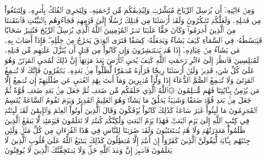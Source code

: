 وَمِنۡ ءَايَٰتِهِۦٓ أَن يُرۡسِلَ ٱلرِّيَاحَ مُبَشِّرَٰتٖ وَلِيُذِيقَكُم مِّن رَّحۡمَتِهِۦ وَلِتَجۡرِيَ ٱلۡفُلۡكُ بِأَمۡرِهِۦ وَلِتَبۡتَغُواْ مِن فَضۡلِهِۦ وَلَعَلَّكُمۡ تَشۡكُرُونَ
وَلَقَدۡ أَرۡسَلۡنَا مِن قَبۡلِكَ رُسُلًا إِلَىٰ قَوۡمِهِمۡ فَجَآءُوهُم بِٱلۡبَيِّنَٰتِ فَٱنتَقَمۡنَا مِنَ ٱلَّذِينَ أَجۡرَمُواْۖ وَكَانَ حَقًّا عَلَيۡنَا نَصۡرُ ٱلۡمُؤۡمِنِينَ
ٱللَّهُ ٱلَّذِي يُرۡسِلُ ٱلرِّيَٰحَ فَتُثِيرُ سَحَابٗا فَيَبۡسُطُهُۥ فِي ٱلسَّمَآءِ كَيۡفَ يَشَآءُ وَيَجۡعَلُهُۥ كِسَفٗا فَتَرَى ٱلۡوَدۡقَ يَخۡرُجُ مِنۡ خِلَٰلِهِۦۖ فَإِذَآ أَصَابَ بِهِۦ مَن يَشَآءُ مِنۡ عِبَادِهِۦٓ إِذَا هُمۡ يَسۡتَبۡشِرُونَ
وَإِن كَانُواْ مِن قَبۡلِ أَن يُنَزَّلَ عَلَيۡهِم مِّن قَبۡلِهِۦ لَمُبۡلِسِينَ
فَٱنظُرۡ إِلَىٰٓ ءَاثَٰرِ رَحۡمَتِ ٱللَّهِ كَيۡفَ يُحۡيِ ٱلۡأَرۡضَ بَعۡدَ مَوۡتِهَآۚ إِنَّ ذَٰلِكَ لَمُحۡيِ ٱلۡمَوۡتَىٰۖ وَهُوَ عَلَىٰ كُلِّ شَيۡءٖ قَدِيرٞ
وَلَئِنۡ أَرۡسَلۡنَا رِيحٗا فَرَأَوۡهُ مُصۡفَرّٗا لَّظَلُّواْ مِنۢ بَعۡدِهِۦ يَكۡفُرُونَ
فَإِنَّكَ لَا تُسۡمِعُ ٱلۡمَوۡتَىٰ وَلَا تُسۡمِعُ ٱلصُّمَّ ٱلدُّعَآءَ إِذَا وَلَّوۡاْ مُدۡبِرِينَ
وَمَآ أَنتَ بِهَٰدِ ٱلۡعُمۡيِ عَن ضَلَٰلَتِهِمۡۖ إِن تُسۡمِعُ إِلَّا مَن يُؤۡمِنُ بِـَٔايَٰتِنَا فَهُم مُّسۡلِمُونَ
۞ٱللَّهُ ٱلَّذِي خَلَقَكُم مِّن ضَعۡفٖ ثُمَّ جَعَلَ مِنۢ بَعۡدِ ضَعۡفٖ قُوَّةٗ ثُمَّ جَعَلَ مِنۢ بَعۡدِ قُوَّةٖ ضَعۡفٗا وَشَيۡبَةٗۚ يَخۡلُقُ مَا يَشَآءُۚ وَهُوَ ٱلۡعَلِيمُ ٱلۡقَدِيرُ
وَيَوۡمَ تَقُومُ ٱلسَّاعَةُ يُقۡسِمُ ٱلۡمُجۡرِمُونَ مَا لَبِثُواْ غَيۡرَ سَاعَةٖۚ كَذَٰلِكَ كَانُواْ يُؤۡفَكُونَ
وَقَالَ ٱلَّذِينَ أُوتُواْ ٱلۡعِلۡمَ وَٱلۡإِيمَٰنَ لَقَدۡ لَبِثۡتُمۡ فِي كِتَٰبِ ٱللَّهِ إِلَىٰ يَوۡمِ ٱلۡبَعۡثِۖ فَهَٰذَا يَوۡمُ ٱلۡبَعۡثِ وَلَٰكِنَّكُمۡ كُنتُمۡ لَا تَعۡلَمُونَ
فَيَوۡمَئِذٖ لَّا يَنفَعُ ٱلَّذِينَ ظَلَمُواْ مَعۡذِرَتُهُمۡ وَلَا هُمۡ يُسۡتَعۡتَبُونَ
وَلَقَدۡ ضَرَبۡنَا لِلنَّاسِ فِي هَٰذَا ٱلۡقُرۡءَانِ مِن كُلِّ مَثَلٖۚ وَلَئِن جِئۡتَهُم بِـَٔايَةٖ لَّيَقُولَنَّ ٱلَّذِينَ كَفَرُوٓاْ إِنۡ أَنتُمۡ إِلَّا مُبۡطِلُونَ
كَذَٰلِكَ يَطۡبَعُ ٱللَّهُ عَلَىٰ قُلُوبِ ٱلَّذِينَ لَا يَعۡلَمُونَ
فَٱصۡبِرۡ إِنَّ وَعۡدَ ٱللَّهِ حَقّٞۖ وَلَا يَسۡتَخِفَّنَّكَ ٱلَّذِينَ لَا يُوقِنُونَ